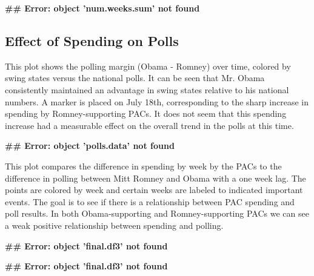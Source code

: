 \documentclass[11pt]{article}\usepackage{graphicx, color}
\makeatletter
\newenvironment{kframe}{%
 \def\at@end@of@kframe{}%
 \ifinner\ifhmode%
  \def\at@end@of@kframe{\end{minipage}}%
  \begin{minipage}{\columnwidth}%
 \fi\fi%
 \def\FrameCommand##1{\hskip\@totalleftmargin \hskip-\fboxsep
 \colorbox{shadecolor}{##1}\hskip-\fboxsep
     \hskip-\linewidth \hskip-\@totalleftmargin \hskip\columnwidth}%
 \MakeFramed {\advance\hsize-\width
   \@totalleftmargin\z@ \linewidth\hsize
   \@setminipage}}%
 {\par\unskip\endMakeFramed%
 \at@end@of@kframe}
\newenvironment{knitrout}{}{} %
\makeatother
\begin{document}
\begin{knitrout}
\color{fgcolor}\begin{kframe}


{\ttfamily\noindent\bfseries\textcolor{errorcolor}{\#\# Error: object 'num.weeks.sum' not found}}\end{kframe}
\end{knitrout}


\subsection{Effect of Spending on Polls}

This plot shows the polling margin (Obama - Romney) over time, colored by swing states versus the national polls. It can be seen that Mr. Obama consistently maintained an advantage in swing states relative to his national numbers. A marker is placed on July 18th, corresponding to the sharp increase in spending by Romney-supporting PACs. It does not seem that this spending increase had a measurable effect on the overall trend in the polls at this time.

\begin{knitrout}
\color{fgcolor}\begin{kframe}


{\ttfamily\noindent\bfseries\textcolor{errorcolor}{\#\# Error: object 'polls.data' not found}}\end{kframe}
\end{knitrout}


This plot compares the difference in spending by week by the PACs to the difference in polling between Mitt Romney and Obama with a one week lag. The points are colored by week and certain weeks are labeled to indicated important events. The goal is to see if there is a relationship between PAC spending and poll results. 
In both Obama-supporting and Romney-supporting PACs we can see a weak positive relationship between spending and polling.

\begin{knitrout}
\color{fgcolor}\begin{kframe}


{\ttfamily\noindent\bfseries\textcolor{errorcolor}{\#\# Error: object 'final.df3' not found}}

{\ttfamily\noindent\bfseries\textcolor{errorcolor}{\#\# Error: object 'final.df3' not found}}\end{kframe}
\end{knitrout}
\end{document}
